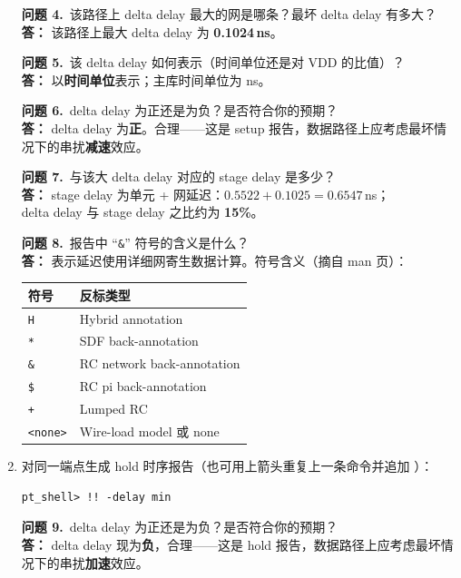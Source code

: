 \begin{enumerate}
\begin{questionBox}
\textbf{问题 4.}\ 该路径上 delta delay 最大的网是哪条？最坏 delta delay 有多大？\\[0.35em]
\textbf{答：} 该路径上最大 delta delay 为 \textbf{0.1024\,ns}。

\textbf{问题 5.}\ 该 delta delay 如何表示（时间单位还是对 VDD 的比值）？\\[0.35em]
\textbf{答：} 以\textbf{时间单位}表示；主库时间单位为 ns。

\textbf{问题 6.}\ delta delay 为正还是为负？是否符合你的预期？\\[0.35em]
\textbf{答：} delta delay 为\textbf{正}。合理——这是 setup 报告，数据路径上应考虑最坏情况下的串扰\textbf{减速}效应。

\textbf{问题 7.}\ 与该大 delta delay 对应的 stage delay 是多少？\\[0.35em]
\textbf{答：} stage delay 为单元 + 网延迟：$0.5522 + 0.1025 = 0.6547$\,ns；\\
delta delay 与 stage delay 之比约为 \textbf{15\%}。

\textbf{问题 8.}\ 报告中 ``\texttt{\&}'' 符号的含义是什么？\\[0.35em]
\textbf{答：} 表示延迟使用详细网寄生数据计算。符号含义（摘自  man 页）：
\begin{center}
\small
\begin{tabular}{@{}ll@{}}
\toprule
\textbf{符号} & \textbf{反标类型} \\
\midrule
\texttt{H} & Hybrid annotation \\
\texttt{*} & SDF back-annotation \\
\texttt{\&} & RC network back-annotation \\
\texttt{\$} & RC pi back-annotation \\
\texttt{+} & Lumped RC \\
\texttt{<none>} & Wire-load model 或 none \\
\bottomrule
\end{tabular}
\end{center}
\end{questionBox}

  \item 对同一端点生成 hold 时序报告（也可用上箭头重复上一条命令并追加 ）：
\begin{lstlisting}
pt_shell> !! -delay min
\end{lstlisting}

\begin{questionBox}
\textbf{问题 9.}\ delta delay 为正还是为负？是否符合你的预期？\\[0.35em]
\textbf{答：} delta delay 现为\textbf{负}，合理——这是 hold 报告，数据路径上应考虑最坏情况下的串扰\textbf{加速}效应。
\end{questionBox}


\end{enumerate}
